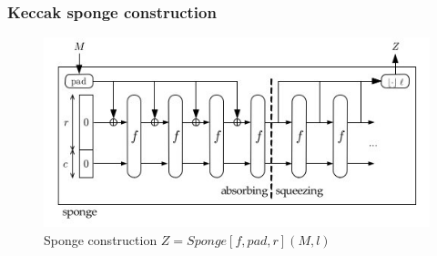 \documentclass{beamer}
\begin{document}
\begin{frame}
\frametitle{Keccak sponge construction}
\begin{figure}[h]
  \begin{center}
    \includegraphics[scale=0.5]{keccakspongeconstruction.jpg}
  \end{center}
  \caption{Sponge construction $Z = Sponge[f, pad, r](M, l)$\footnotemark}
  \label{fig:lab}
\end{figure}
\end{frame}
\end{document}
